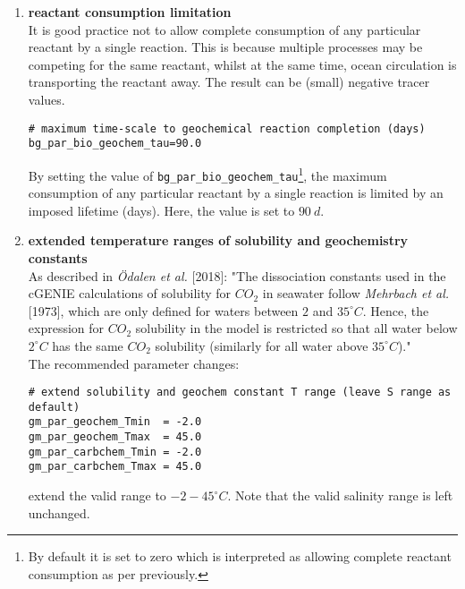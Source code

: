 \begin{itemize}[noitemsep]
\begin{enumerate}[noitemsep]
\vspace{1mm}
\item \textbf{reactant consumption limitation}
\\It is good practice not to allow complete consumption of any particular reactant by a single reaction. This is because multiple processes may be competing for the same reactant, whilst at the same time, ocean circulation is transporting the reactant away. The result can be (small) negative tracer values.
\small\vspace{-1mm}\begin{verbatim}
# maximum time-scale to geochemical reaction completion (days)
bg_par_bio_geochem_tau=90.0
\end{verbatim}\vspace{-1mm}\normalsize
By setting the value of \texttt{bg\_par\_bio\_geochem\_tau}\footnote{By default it is set to zero which is interpreted as allowing complete reactant consumption as per previously.}, the maximum consumption of any particular reactant by a single reaction is limited by an imposed lifetime (days). Here, the value is set to \(90\:d\).
\vspace{1mm}
\item \textbf{extended temperature ranges of solubility and geochemistry constants}
\\As described in \textit{Ödalen et al.} [2018]: "The dissociation constants used in the cGENIE calculations of solubility for \(CO_{2}\) in seawater follow \textit{Mehrbach et al.} [1973], which are only defined for waters between \(2\) and \(35^{\circ}C\). Hence, the expression for \(CO_{2}\) solubility in the model is restricted so that all water below \(2^{\circ}C\) has the same \(CO_{2}\) solubility (similarly for all water above \(35^{\circ}C\))."
\\The recommended parameter changes:
\small\vspace{-1mm}\begin{verbatim}
# extend solubility and geochem constant T range (leave S range as default)
gm_par_geochem_Tmin  = -2.0
gm_par_geochem_Tmax  = 45.0
gm_par_carbchem_Tmin = -2.0
gm_par_carbchem_Tmax = 45.0
\end{verbatim}\vspace{-1mm}\normalsize
extend the valid range to \(-2 - 45^{\circ}C\). Note that the valid salinity range is left unchanged.
\end{enumerate}


\end{itemize}
